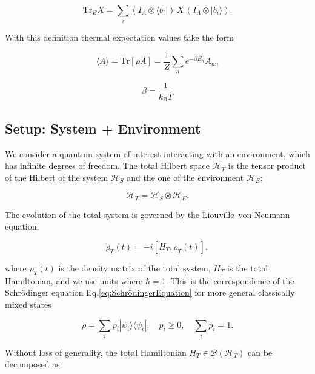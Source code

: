 \begin{equation} \label{eq:ho_partial_trace_definition}
	\mathrm{Tr}_B X = \sum_i (I_A \otimes \langle b_i|) \, X \, (I_A \otimes |b_i\rangle).
\end{equation}

\noindent
With this definition thermal expectation values take the form

\begin{equation} \label{eq:ho_expectation_value} \langle A \rangle = \mathrm{Tr}[\rho A] = \frac{1}{Z} \sum_n e^{-\beta E_n} A_{nn}
\end{equation}

\begin{equation} \label{eq:ho_beta_definition}
	\beta = \frac{1}{k_{\mathrm{B}} T}
\end{equation}


\subsection{Setup: System + Environment}

\noindent
We consider a quantum system of interest interacting with an environment, which has infinite degrees of freedom. The total Hilbert space $\mathcal{H}_T$ is the tensor product of the Hilbert of the system $\mathcal{H}_S$ and the one of the environment $\mathcal{H}_E$:

\begin{equation}
	\mathcal{H}_T = \mathcal{H}_S \otimes \mathcal{H}_E.
	\label{eq:Total_Hilbert_Space}
\end{equation}

\noindent
The evolution of the total system is governed by the Liouville–von Neumann equation:

\begin{equation}
	\dot{\rho}_T(t) = -i[H_T, \rho_T(t)],
	\label{eq:Von_Neumann_Equation}
\end{equation}

\noindent
where $\rho_T(t)$ is the density matrix of the total system, $H_T$ is the total Hamiltonian, and we use units where $\hbar = 1$. This is the correspondence of the Schrödinger equation Eq.\eqref{eq:SchrödingerEquation} for more general classically mixed states 

\begin{equation}
	\rho = \sum_i p_i |\psi_i\rangle \langle \psi_i|, \quad p_i \geq 0, \quad \sum_i p_i = 1.
\end{equation}

\noindent
Without loss of generality, the total Hamiltonian $H_T \in \mathcal{B}(\mathcal{H}_T)$ can be decomposed as:

